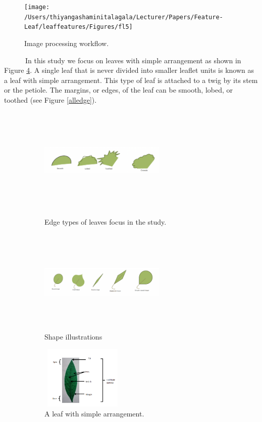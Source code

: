\documentclass{article}
\begin{document}
\begin{figure}[!ht]

{\centering \texttt{[image: /Users/thiyangashaminitalagala/Lecturer/Papers/Feature-Leaf/leaffeatures/Figures/fl5]} 

}

\caption{\label{fig:test2}Image processing workflow.}\label{fig:unnamed-chunk-2}
\end{figure}

~~~~~~In this study we focus on leaves with simple arrangement as shown
in Figure \ref{simplearra}. A single leaf that is never divided into
smaller leaflet units is known as a leaf with simple arrangement. This
type of leaf is attached to a twig by its stem or the petiole. The
margins, or edges, of the leaf can be smooth, lobed, or toothed (see
Figure \ref{alledge}).

\begin{figure}[!ht]
\begin{subfigure}{.5\textwidth}
\centering
\includegraphics[width=60mm, height=50mm]{Figures/alledge.png}
        \caption{\label{alledge} Edge types of leaves focus in the study.}
\centering
        \includegraphics[width=60mm, height=50mm]{Figures/imgshape.png}
        \caption{\label{shapeimg}Shape illustrations}       
        
\end{subfigure} 
\begin{subfigure}{.5\textwidth}
\centering
        \includegraphics[width=40mm, height=30mm]{Figures/simple_leaf_parts.png}
        \caption{\label{simplearra} A leaf with simple arrangement.}
        
\end{subfigure} 

\caption{}
        \end{figure}
\end{document}
